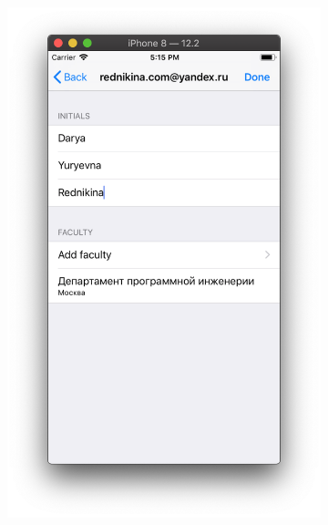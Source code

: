 \documentclass[a4paper,12pt]{article}
\begin{document}
\begin{figure}[h!]
\begin{subfigure}[b]{0.3\linewidth}
			\includegraphics[width=\linewidth]{../includes/pmi/r2.png}
		\end{subfigure}
		\begin{subfigure}[b]{0.3\linewidth}

\end{subfigure}
\end{figure}
\end{document}
